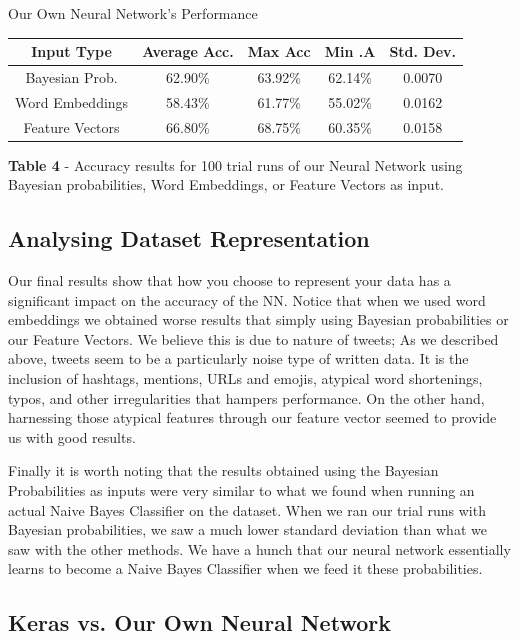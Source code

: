 \documentclass[11pt,onecolumn]{article} %
\begin{document}
	\begin{center}
		Our Own Neural Network's Performance
		\begin{tabular}{ | c | c | c | c | c |}
			\hline
			Input Type & Average Acc.  & Max Acc & Min .A& Std. Dev. \\
			\hline
			Bayesian Prob. & 62.90\% & 63.92\% & 62.14\% & 0.0070 \\
			\hline
			Word Embeddings & 58.43\% &	61.77\% & 55.02\% & 0.0162 \\
			\hline
			Feature Vectors & 66.80\% & 68.75\% & 60.35\% & 0.0158 \\
			\hline
		\end{tabular}
		\newline
		\newline
		\textbf{Table 4} - Accuracy results for 100 trial runs of our Neural Network using Bayesian probabilities, Word Embeddings, or Feature Vectors as input.
	\end{center}
	
	\subsection{Analysing Dataset Representation}
	Our final results show that how you choose to represent your data has a significant impact on the accuracy of the NN. Notice that when we used word embeddings we obtained worse results that simply using Bayesian probabilities or our Feature Vectors. We believe this is due to nature of tweets; As we described above, tweets seem to be a particularly noise type of written data. It is the inclusion of hashtags, mentions, URLs and emojis, atypical word shortenings, typos, and other irregularities that hampers performance. On the other hand, harnessing those atypical features through our feature vector seemed to provide us with good results. 
	\par Finally it is worth noting that the results obtained using the Bayesian Probabilities as inputs were very similar to what we found when running an actual Naive Bayes Classifier on the dataset. When we ran our trial runs with Bayesian probabilities, we saw a much lower standard deviation than what we saw with the other methods. We have a hunch that our neural network essentially learns to become a Naive Bayes Classifier when we feed it these probabilities.
	
	\subsection{Keras vs. Our Own Neural Network}
	
\end{document}
